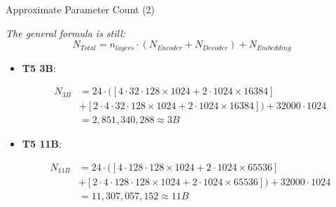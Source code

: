 \documentclass[11pt,compress,t,notes=noshow, xcolor=table]{beamer}
\begin{document}
\begin{frame}{Approximate Parameter Count (2)}

\textit{The general formula is still:} $$N_{Total} = n_{layers}\cdot (N_{Encoder} + N_{Decoder}) + N_{Embedding}$$

\begin{itemize}
    \item \textbf{T5 3B}: 

					\begin{align*}
							N_{3B} &= 24\cdot ([4\cdot 32\cdot 128 \times 1024 + 2\cdot 1024 \times 16384] \\
							&+ [2\cdot 4 \cdot 32\cdot 128 \times 1024 + 2\cdot 1024 \times 16384]) + 32000\cdot 1024 \\
							&= 2,851,340,288 \approx 3B
					\end{align*}

    \item \textbf{T5 11B}:

					\begin{align*}
							N_{11B} &= 24\cdot ([4\cdot 128\cdot 128 \times 1024 + 2\cdot 1024 \times 65536] \\
							&+ [2\cdot 4 \cdot 128\cdot 128 \times 1024 + 2\cdot 1024 \times 65536]) + 32000\cdot 1024 \\
							&= 11,307,057,152 \approx 11B
					\end{align*}

\end{itemize}
    
\end{frame}


\endlecture
\end{document}
